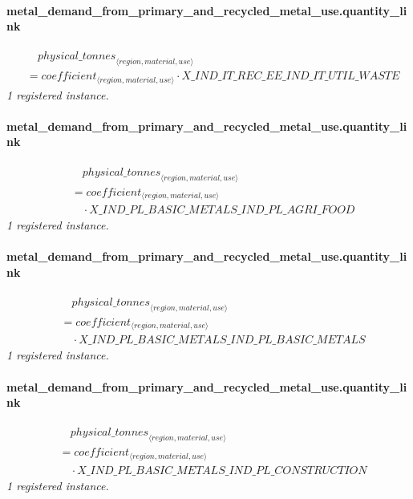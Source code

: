\documentclass[11pt]{article}
\begin{document}
\paragraph{metal\_demand\_from\_primary\_and\_recycled\_metal\_use.quantity\_link}
\begin{align*}
&\quad {physical\_tonnes}_{\langle region, material, use\rangle}\\
&= coefficient_{\langle region, material, use\rangle} \cdot X\_IND\_IT\_REC\_EE\_IND\_IT\_UTIL\_WASTE
\end{align*}
\noindent\emph{1 registered instance.}\par
\paragraph{metal\_demand\_from\_primary\_and\_recycled\_metal\_use.quantity\_link}
\begin{align*}
&\quad {physical\_tonnes}_{\langle region, material, use\rangle}\\
&= coefficient_{\langle region, material, use\rangle}\\
&\quad {}\cdot X\_IND\_PL\_BASIC\_METALS\_IND\_PL\_AGRI\_FOOD
\end{align*}
\noindent\emph{1 registered instance.}\par
\paragraph{metal\_demand\_from\_primary\_and\_recycled\_metal\_use.quantity\_link}
\begin{align*}
&\quad {physical\_tonnes}_{\langle region, material, use\rangle}\\
&= coefficient_{\langle region, material, use\rangle}\\
&\quad {}\cdot X\_IND\_PL\_BASIC\_METALS\_IND\_PL\_BASIC\_METALS
\end{align*}
\noindent\emph{1 registered instance.}\par
\paragraph{metal\_demand\_from\_primary\_and\_recycled\_metal\_use.quantity\_link}
\begin{align*}
&\quad {physical\_tonnes}_{\langle region, material, use\rangle}\\
&= coefficient_{\langle region, material, use\rangle}\\
&\quad {}\cdot X\_IND\_PL\_BASIC\_METALS\_IND\_PL\_CONSTRUCTION
\end{align*}
\noindent\emph{1 registered instance.}\par
\end{document}

